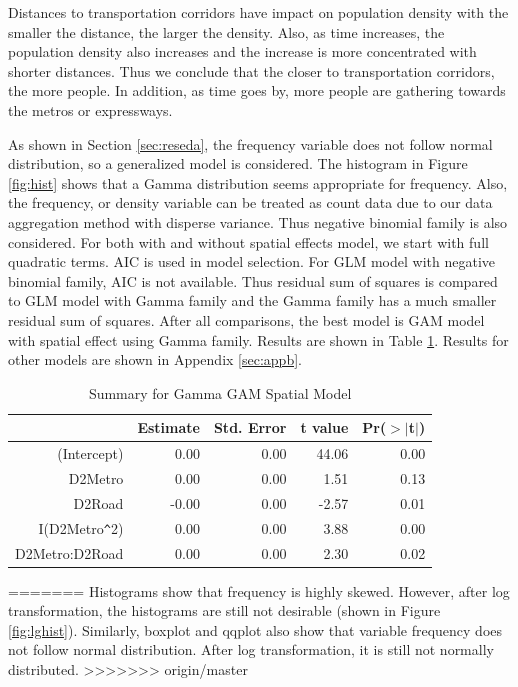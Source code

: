 \documentclass[hidelinks,12pt]{article}
\begin{document}
	Distances to transportation corridors have impact on population density with the smaller the distance, the larger the density. Also, as time increases, the population density also increases and the increase is more concentrated with shorter distances. Thus we conclude that the closer to transportation corridors, the more people. In addition, as time goes by, more people are gathering towards the metros or expressways.
	
	As shown in Section \ref{sec:reseda}, the frequency variable does not follow normal distribution, so a generalized model is considered. The histogram in Figure \ref{fig:hist} shows that a Gamma distribution seems appropriate for frequency. Also, the frequency, or density variable can be treated as count data due to our data aggregation method with disperse variance. Thus negative binomial family is also considered. For both with and without spatial effects model, we start with full quadratic terms. AIC is used in model selection. For GLM model with negative binomial family, AIC is not available. Thus residual sum of squares is compared to GLM model with Gamma family and the Gamma family has a much smaller residual sum of squares. After all comparisons, the best model is GAM model with spatial effect using Gamma family. Results are shown in Table \ref{tbl:bestx}. Results for other models are shown in Appendix \ref{sec:appb}.	
	\begin{table}[ht]
		\centering
		\caption{Summary for Gamma GAM Spatial Model \label{tbl:bestx}}
		\begin{tabular}{rrrrr}
			\hline
			& Estimate & Std. Error & t value & Pr($>$$|$t$|$) \\ 
			\hline
			(Intercept) & 0.00 & 0.00 & 44.06 & 0.00 \\ 
			D2Metro & 0.00 & 0.00 & 1.51 & 0.13 \\ 
			D2Road & -0.00 & 0.00 & -2.57 & 0.01 \\ 
			I(D2Metro\verb|^|2) & 0.00 & 0.00 & 3.88 & 0.00 \\ 
			D2Metro:D2Road & 0.00 & 0.00 & 2.30 & 0.02 \\ 
			\hline
		\end{tabular}
	\end{table}
=======
	Histograms show that frequency is highly skewed. However, after log transformation, the histograms are still not desirable (shown in Figure \ref{fig:lghist}). Similarly, boxplot and qqplot also show that variable frequency does not follow normal distribution. After log transformation, it is still not normally distributed.
>>>>>>> origin/master
\end{document}
